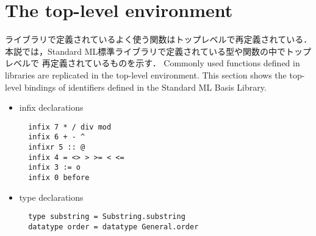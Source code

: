 \documentclass{jbook}
\newcommand{\txt}[2]{#2}
\begin{document}
\section{\txt{トップレベル環境}{The top-level environment}}
\ifjp%
	ライブラリで定義されているよく使う関数はトップレベルで再定義されている．
	本説では，Standard ML標準ライブラリで定義されている型や関数の中でトップレベルで
再定義されているものを示す．
\else%
	Commonly used functions defined in libraries are replicated in
the top-level environment.
	This section shows the top-level bindings of identifiers defined
in the Standard ML Basis Library.
\fi%

\begin{itemize}
\item {\txt{infix宣言}{infix declarations}}
\begin{verbatim}
  infix 7 * / div mod
  infix 6 + - ^
  infixr 5 :: @
  infix 4 = <> > >= < <=
  infix 3 := o
  infix 0 before
\end{verbatim}

\item {\txt{type宣言}{type declarations}}
\begin{verbatim}
  type substring = Substring.substring
  datatype order = datatype General.order
\end{verbatim}


\end{itemize}
\end{document}
